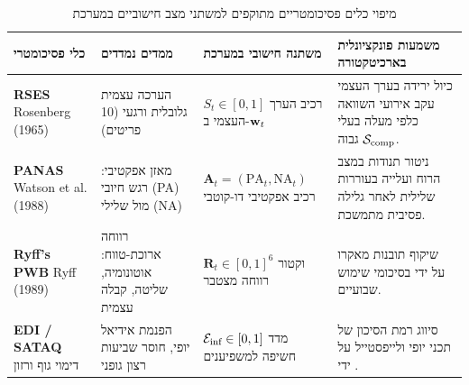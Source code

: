 \begin{table}[H]
\centering
\caption{מיפוי כלים פסיכומטריים מתוקפים למשתני מצב חישוביים במערכת \projectname{}}
\label{tab:psychometric_mapping}
\footnotesize
\renewcommand{\arraystretch}{0.90}
\begin{tabularx}{\textwidth}{>{\raggedleft\arraybackslash}p{2.6cm} >{\raggedleft\arraybackslash}p{2.5cm} >{\raggedleft\arraybackslash}p{3.2cm} X}
\toprule
\rowcolor{LavenderCard}
\textbf{\color{DarkPurple}כלי פסיכומטרי} & \textbf{\color{DarkPurple}ממדים נמדדים} & \textbf{\color{DarkPurple}משתנה חישובי במערכת} & \textbf{\color{DarkPurple}משמעות פונקציונלית בארכיטקטורה} \\
\midrule
\textbf{\textenglish{RSES}} \newline \textenglish{Rosenberg (1965)}~\cite{rosenberg1965society} & 
הערכה עצמית גלובלית ורגעי (10 פריטים) & 
$S_t \in [0, 1]$ \newline רכיב הערך העצמי ב-$\mathbf{w}_t{}$ & 
כיול ירידה בערך העצמי עקב אירועי השוואה כלפי מעלה בעלי $\mathcal{S}_{\text{comp}}{}$ גבוה. \\
\midrule
\textbf{\textenglish{PANAS}} \newline \textenglish{Watson et al. (1988)}~\cite{watson1988development} & 
מאזן אפקטיבי: רגש חיובי (\textenglish{PA}) מול שלילי (\textenglish{NA}) & 
$\mathbf{A}_t = (\mathrm{PA}_t, \mathrm{NA}_t)$ \newline רכיב אפקטיבי דו-קוטבי & 
ניטור תנודות במצב הרוח ועלייה בעוררות שלילית לאחר גלילה פסיבית מתמשכת. \\
\midrule
\textbf{\textenglish{Ryff's PWB}} \newline \textenglish{Ryff (1989)}~\cite{ryff1989happiness} & 
רווחה ארוכת-טווח: אוטונומיה, שליטה, קבלה עצמית & 
$\mathbf{R}_t \in [0, 1]^6$ \newline וקטור רווחה מצטבר & 
שיקוף תובנות מאקרו על ידי \agentReflector{} בסיכומי שימוש שבועיים. \\
\midrule
\textbf{\textenglish{EDI / SATAQ}} \newline דימוי גוף ורזון~\cite{perloff2014social} & 
הפנמת אידיאל יופי, חוסר שביעות רצון גופני & 
$\mathcal{E}_{\text{inf}}{} \in [0, 1]$ \newline מדד חשיפה למשפיענים & 
סיווג רמת הסיכון של תכני יופי ולייפסטייל על ידי \agentAnalyst{}. \\
\bottomrule
\end{tabularx}
\end{table}

